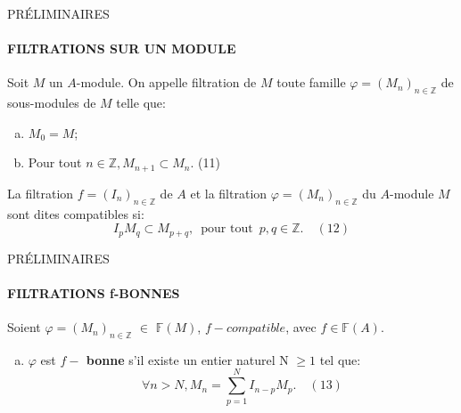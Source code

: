 \documentclass[11pt,a4paper]{beamer}
\begin{document}
		\begin{frame}{PRÉLIMINAIRES}
		\framesubtitle{FILTRATIONS SUR UN MODULE}
		\begin{block}{}
		Soit $M$ un $A$-module. On appelle filtration de $M$ toute famille $\varphi = (M_n)_{n \in \mathbb{Z}}$ de sous-modules de $M$ telle que:
			\begin{enumerate}[(a)]
				\item $M_0 = M$;
				\item Pour tout $n \in \mathbb{Z}, M_{n+1} \subset M_n$. (11)
			\end{enumerate}
			La filtration $f = (I_n)_{n \in \mathbb{Z}}$ de $A$ et la filtration $\varphi = (M_n)_{n \in \mathbb{Z}}$ du $A$-module $M$ sont dites compatibles si:
			\[ I_p M_q \subset M_{p+q} ,\, \text{ pour tout } \, p, q \in \mathbb{Z}. \quad (12)\]
		\end{block}
	\end{frame}
	
	\begin{frame}{PRÉLIMINAIRES}
		\framesubtitle{FILTRATIONS f-BONNES}
		\begin{block}{}
			Soient $\varphi=(M_n)_{n \in \mathbb{Z}}$ $\in$ $\mathbb{F}(M)$, $f-compatible$, avec $f \in \mathbb{F}(A)$.
			\begin{enumerate}[(a)]
				\item $\varphi$ est \textbf{$f-$ bonne} s'il existe un entier naturel N $\geqslant 1$ tel que:
				\[\forall n > N, M_{n}=\sum_{p=1}^{N}I_{n-p}M_{p}. \quad (13)\]
			\end{enumerate}
		\end{block}
	\end{frame}
	
\end{document}
